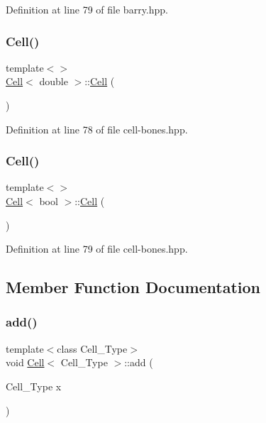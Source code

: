 Definition at line 79 of file barry.\+hpp.

\mbox{\label{class_cell_a5ecdaddaf4661a9a8fe6f0ed61595847}} 
\subsubsection{\texorpdfstring{Cell()}{Cell()}\hspace{0.1cm}{\footnotesize\ttfamily [8/9]}}
{\footnotesize\ttfamily template$<$$>$ \\
\hyperlink{class_cell}{Cell}$<$ double $>$\+::\hyperlink{class_cell}{Cell} (\begin{DoxyParamCaption}{ }\end{DoxyParamCaption})\hspace{0.3cm}{\ttfamily [inline]}}



Definition at line 78 of file cell-\/bones.\+hpp.

\mbox{\label{class_cell_aef4b64101b33e2349ceea132b962d137}} 
\subsubsection{\texorpdfstring{Cell()}{Cell()}\hspace{0.1cm}{\footnotesize\ttfamily [9/9]}}
{\footnotesize\ttfamily template$<$$>$ \\
\hyperlink{class_cell}{Cell}$<$ bool $>$\+::\hyperlink{class_cell}{Cell} (\begin{DoxyParamCaption}{ }\end{DoxyParamCaption})\hspace{0.3cm}{\ttfamily [inline]}}



Definition at line 79 of file cell-\/bones.\+hpp.



\subsection{Member Function Documentation}
\mbox{\label{class_cell_a3d063afd2a8743623d0e524debbd55e9}} 
\subsubsection{\texorpdfstring{add()}{add()}\hspace{0.1cm}{\footnotesize\ttfamily [1/9]}}
{\footnotesize\ttfamily template$<$class Cell\+\_\+\+Type$>$ \\
void \hyperlink{class_cell}{Cell}$<$ Cell\+\_\+\+Type $>$\+::add (\begin{DoxyParamCaption}\item[{Cell\+\_\+\+Type}]{x }\end{DoxyParamCaption})}

